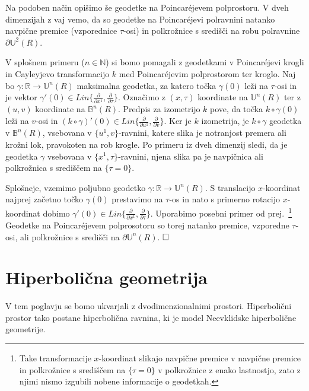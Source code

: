 \documentclass[a4paper]{article}
\def\qed{$\hfill\Box$}   %
\begin{document}
Na podoben način opišimo še geodetke na Poincar\'ejevem polprostoru.
V dveh dimenzijah z vaj vemo, da so geodetke na Poincar\'ejevi polravnini natanko navpične premice (vzporednice $\tau$-osi) in polkrožnice s središči na robu polravnine $\partial \mathbb{U}^{2}(R)$.

V splošnem primeru ($n \in \mathbb{N}$) si bomo pomagali z geodetkami v Poincar\'ejevi krogli in Cayleyjevo transformacijo $k$ med Poincar\'ejevim polprostorom ter kroglo.
%
Naj bo $\gamma \colon \mathbb{R} \to \mathbb{U}^{n}(R)$ maksimalna geodetka, za katero točka $\gamma(0)$ leži na $\tau$-osi in je vektor $\gamma'(0) \in \mathit{Lin} \{ \frac{\partial}{\partial x^{1}}, \frac{\partial}{\partial \tau} \}$.
Označimo z $(x,\tau)$ koordinate na $\mathbb{U}^{n}(R)$ ter z $(u,v)$ koordinate na $\mathbb{B}^{n}(R)$. Predpis za izometrijo $k$ pove, da točka $k \circ \gamma (0)$ leži na $v$-osi in $(k \circ \gamma)'(0) \in \mathit{Lin} \{ \frac{\partial}{\partial u^{1}}, \frac{\partial}{\partial v} \}$.
Ker je $k$ izometrija, je $k \circ \gamma$ geodetka v $\mathbb{B}^{n}(R)$, vsebovana v $\{u^{1},v \}$-ravnini, katere slika je notranjost premera ali krožni lok, pravokoten na rob krogle. Po primeru iz dveh dimenzij sledi, da je geodetka $\gamma$ vsebovana v $\{ x^{1}, \tau \}$-ravnini, njena slika pa je navpičnica ali polkrožnica s središčem na $\{ \tau = 0 \}$.

Splošneje, vzemimo poljubno geodetko $\gamma \colon \mathbb{R} \to \mathbb{U}^{n}(R)$. S translacijo $x$-koordinat najprej začetno točko $\gamma (0)$ prestavimo na $\tau$-os in nato s primerno rotacijo $x$-koordinat dobimo $\gamma'(0) \in \textit{Lin} \{ \frac{\partial}{\partial x^{1}}, \frac{\partial}{\partial \tau} \}$.
Uporabimo posebni primer od prej.~\footnote{Take transformacije $x$-koordinat slikajo navpične premice v navpične premice in polkrožnice s središčem na $\{ \tau =0 \}$ v polkrožnice z enako lastnostjo, zato z njimi nismo izgubili nobene informacije o geodetkah.}
Geodetke na Poincar\'ejevem polprosotoru so torej natanko premice, vzporedne $\tau$-osi, ali polkrožnice s središči na $\partial \mathbb{U}^{n}(R)$.
\qed

\section{Hiperbolična geometrija}

V tem poglavju se bomo ukvarjali z dvodimenzionalnimi prostori. Hiperbolični prostor tako postane hiperbolična ravnina, ki je model Neevklidske hiperbolične geometrije.
\end{document}
